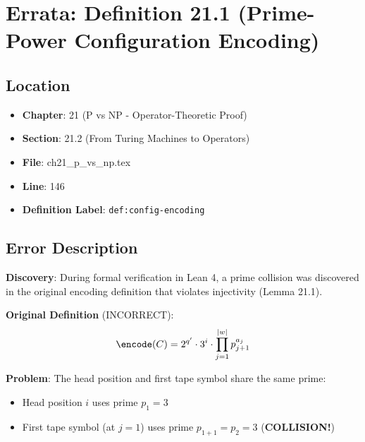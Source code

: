
\section*{Errata: Definition 21.1 (Prime-Power Configuration Encoding)}

\subsection*{Location}
\begin{itemize}
\item \textbf{Chapter}: 21 (P vs NP - Operator-Theoretic Proof)
\item \textbf{Section}: 21.2 (From Turing Machines to Operators)
\item \textbf{File}: ch21\_p\_vs\_np.tex
\item \textbf{Line}: 146
\item \textbf{Definition Label}: \texttt{def:config-encoding}
\end{itemize}

\subsection*{Error Description}

\textbf{Discovery}: During formal verification in Lean 4, a prime collision was discovered in the original encoding definition that violates injectivity (Lemma 21.1).

\textbf{Original Definition} (INCORRECT):
\begin{equation}
\encode(C) = 2^{q'} \cdot 3^{i} \cdot \prod_{j=1}^{|w|} p_{j+1}^{a_j}
\end{equation}

\textbf{Problem}: The head position and first tape symbol share the same prime:
\begin{itemize}
\item Head position $i$ uses prime $p_1 = 3$
\item First tape symbol (at $j=1$) uses prime $p_{1+1} = p_2 = 3$ \quad (\textbf{COLLISION!})
\end{itemize}

